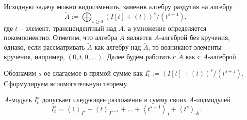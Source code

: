     Исходную задачу можно видоизменить, заменив алгебру раздутия на алгебру
    \begin{equation*}
        \widetilde{A} := \bigoplus_{s \geq 0}{(I[t] + (t))^s / (t^{s + 1})},
    \end{equation*}
    где $t$ -- элемент, трансцендентный над $A$, а умножение определяется покомпонентно. 
    Отметим, что алгебра $\widetilde{A}$ является
    $A$-алгеброй без кручения, однако, если рассматривать $\widetilde{A}$ как алгебру над 
    $\widetilde{A}$, то возникают элементы кручения, например, $(0, t, 0, \dots)$. Далее будем 
    работать с $\widetilde{A}$ как с $A$-алгеброй.

    Обозначим $s$-ое слагаемое в прямой сумме как $I^s_t := (I[t] + (t))^s / (t^{s + 1})$.
    Сформулируем вспомогательную теорему
    \begin{Lemma}
        $A$-модуль $I^s_t$ допускает следующее разложение в сумму своих $A$-под\-мо\-ду\-лей
        \begin{equation} \label{sl}
            I^s_t = \left< 1  \right>_{I^s} + 
                    \left< t \right>_{I^{s-1}} + 
                    \dots +
                    \left< t^{s-1} \right>_{I} + 
                    \left< t^s \right>_A.
        \end{equation}
    \end{Lemma}

